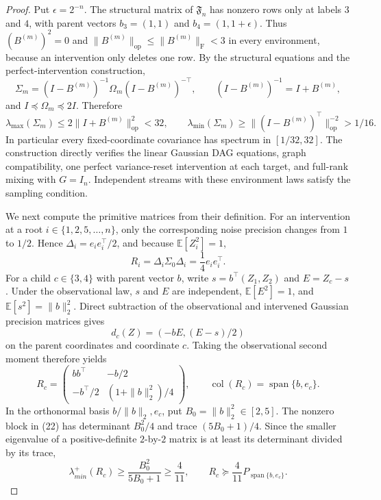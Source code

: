 \documentclass{article}
\begin{document}
\begin{proof}
Put \(\epsilon=2^{-n}\).  The structural matrix of \(\mathfrak F_n\) has nonzero rows only at labels \(3\) and \(4\), with parent vectors \(b_3=(1,1)\) and \(b_4=(1,1+\epsilon)\).  Thus \((B^{(m)})^2=0\) and \(\|B^{(m)}\|_{\mathrm{op}}\le\|B^{(m)}\|_{\mathrm F}<3\) in every environment, because an intervention only deletes one row.  By the structural equations and the perfect-intervention construction,
\[
\Sigma_m=(I-B^{(m)})^{-1}\Omega_m(I-B^{(m)})^{-\top},
\qquad
(I-B^{(m)})^{-1}=I+B^{(m)},
\]
and \(I\preceq\Omega_m\preceq2I\).  Therefore
\[
 \lambda_{\max}(\Sigma_m)
 \le2\|I+B^{(m)}\|_{\mathrm{op}}^2<32,
 \qquad
 \lambda_{\min}(\Sigma_m)
 \ge\|(I-B^{(m)})^{\top}\|_{\mathrm{op}}^{-2}>1/16.
 \tag{20}
\]
In particular every fixed-coordinate covariance has spectrum in \([1/32,32]\).  The construction directly verifies the linear Gaussian DAG equations, graph compatibility, one perfect variance-reset intervention at each target, and full-rank mixing with \(G=I_n\).  Independent streams with these environment laws satisfy the sampling condition.

We next compute the primitive matrices from their definition.  For an intervention at a root \(i\in\{1,2,5,\ldots,n\}\), only the corresponding noise precision changes from \(1\) to \(1/2\).  Hence \(\Delta_i=e_ie_i^{\top}/2\), and because \(\mathbb E[Z_i^2]=1\),
\[
 R_i=\Delta_i\Sigma_0\Delta_i=\frac14e_ie_i^{\top}.
 \tag{21}
\]
For a child \(c\in\{3,4\}\) with parent vector \(b\), write \(s=b^{\top}(Z_1,Z_2)\) and \(E=Z_c-s\).  Under the observational law, \(s\) and \(E\) are independent, \(\mathbb E[E^2]=1\), and \(\mathbb E[s^2]=\|b\|_2^2\).  Direct subtraction of the observational and intervened Gaussian precision matrices gives
\[
d_c(Z)=(-bE,(E-s)/2)
\]
on the parent coordinates and coordinate \(c\).  Taking the observational second moment therefore yields
\[
 R_c=
 \begin{pmatrix}
 bb^{\top}&-b/2\\
 -b^{\top}/2&(1+\|b\|_2^2)/4
 \end{pmatrix},
 \qquad
 \operatorname{col}(R_c)=\operatorname{span}\{b,e_c\}.
 \tag{22}
\]
In the orthonormal basis \(b/\|b\|_2,e_c\), put \(B_0=\|b\|_2^2\in[2,5]\).  The nonzero block in (22) has determinant \(B_0^2/4\) and trace \((5B_0+1)/4\).  Since the smaller eigenvalue of a positive-definite \(2\)-by-\(2\) matrix is at least its determinant divided by its trace,
\[
 \lambda_{min}^{+}(R_c)
 \ge\frac{B_0^2}{5B_0+1}\ge\frac4{11},
 \qquad
 R_c\succeq\frac4{11}P_{\operatorname{span}\{b,e_c\}}.
 \tag{23}
\]


\end{proof}
\end{document}
